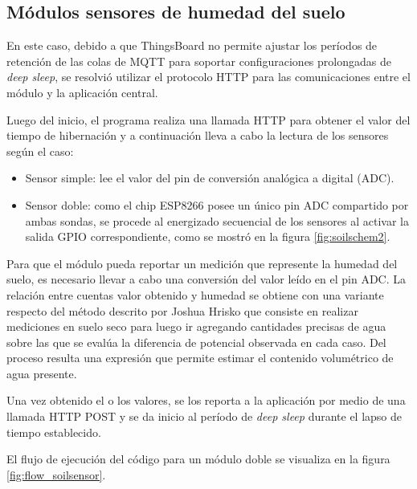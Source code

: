 \subsection{Módulos sensores de humedad del suelo}
\label{Módulos sensores de humedad del suelo}



En este caso, debido a que ThingsBoard no permite ajustar los períodos de retención de las colas de MQTT para soportar configuraciones prolongadas de \textit{deep sleep}, se resolvió utilizar el protocolo HTTP para las comunicaciones entre el módulo y la aplicación central. 

Luego del inicio, el programa realiza una llamada HTTP para obtener el valor del tiempo de hibernación y a continuación lleva a cabo la lectura de los sensores según el caso:
\begin{itemize}
\item Sensor simple: lee el valor del pin de conversión analógica a digital (ADC).
\item Sensor doble: como el chip ESP8266 posee un único pin ADC compartido por ambas sondas, se procede al energizado secuencial de los sensores al activar la salida GPIO correspondiente, como se mostró en la figura \ref{fig:soilschem2}. 

\end{itemize}


Para que el módulo pueda reportar un medición que represente la humedad del suelo, es necesario llevar a cabo una conversión del valor leído en el pin ADC. La relación entre cuentas valor obtenido y humedad se obtiene con una variante respecto del método descrito por Joshua Hrisko \citep{soilcalibration} que consiste en realizar mediciones en suelo seco para luego ir agregando cantidades precisas de agua sobre las que se evalúa la diferencia de potencial observada en cada caso. Del proceso resulta una expresión que permite estimar el contenido volumétrico de agua presente.

Una vez obtenido el o los valores, se los reporta a la aplicación por medio de una llamada HTTP POST y se da inicio al período de \textit{deep sleep} durante el lapso de tiempo establecido.

El flujo de ejecución del código para un módulo doble se visualiza en la figura \ref{fig:flow_soilsensor}.


